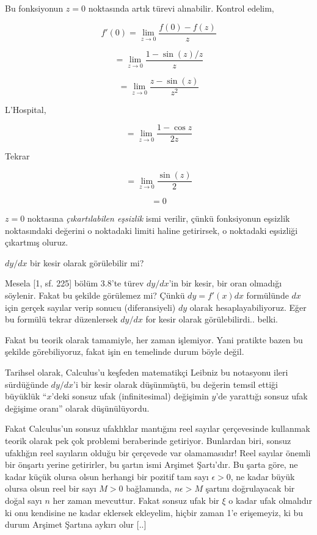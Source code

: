 \documentclass[12pt,fleqn]{article}\usepackage{../../common}
\begin{document}
Bu fonksiyonun $z=0$ noktasında artık türevi alınabilir. Kontrol edelim, 

$$ f'(0) = \lim_{z \to 0} \frac{f(0)-f(z)}{z}  $$

$$ = \lim_{z \to 0} \frac{1-\sin(z)/z}{z} $$

$$ = \lim_{z \to 0} \frac{z-\sin(z)}{z^2} $$

L'Hospital,

$$ = \lim_{z \to 0} \frac{1 - \cos z}{2z} $$

Tekrar

$$ = \lim_{z \to 0} \frac{ \sin(z)}{2} $$

$$ = 0 $$

$z=0$ noktasına {\em çıkartılabilen eşsizlik} ismi verilir, çünkü
fonksiyonun eşsizlik noktasındaki değerini o noktadaki limiti haline
getirirsek, o noktadaki eşsizliği çıkartmış oluruz. 

\newpage

$dy/dx$ bir kesir olarak görülebilir mi? 

Mesela [1, sf. 225] bölüm 3.8'te türev $dy/dx$'in bir kesir, bir oran
olmadığı söylenir. Fakat bu şekilde görülemez mi? Çünkü $dy = f'(x)dx$
formülünde $dx$ için gerçek sayılar verip sonucu (diferansiyeli) $dy$
olarak hesaplayabiliyoruz. Eğer bu formülü tekrar düzenlersek $dy/dx$ for
kesir olarak görülebilirdi.. belki.

Fakat bu teorik olarak tamamiyle, her zaman işlemiyor. Yani pratikte bazen
bu şekilde görebiliyoruz, fakat işin en temelinde durum böyle değil.

Tarihsel olarak, Calculus'u keşfeden matematikçi Leibniz bu notasyonu ileri
sürdüğünde $dy/dx$'i bir kesir olarak düşünmüştü, bu değerin temsil ettiği
büyüklük ``$x$'deki sonsuz ufak (infinitesimal) değişimin $y$'de yarattığı
sonsuz ufak değişime oranı'' olarak düşünülüyordu.

Fakat Calculus'un sonsuz ufaklıklar mantığını reel sayılar çerçevesinde
kullanmak teorik olarak pek çok problemi beraberinde getiriyor. Bunlardan
biri, sonsuz ufaklığın reel sayıların olduğu bir çerçevede var
olamamasıdır! Reel sayılar önemli bir önşartı yerine getirirler, bu şartın
ismi Arşimet Şartı'dır. Bu şarta göre, ne kadar küçük olursa olsun herhangi
bir pozitif tam sayı $\epsilon > 0$, ne kadar büyük olursa olsun reel bir
sayı $M>0$ bağlamında, $n\epsilon > M$ şartını doğrulayacak bir doğal sayı
$n$ her zaman mevcuttur. Fakat sonsuz ufak bir $\xi$ o kadar ufak olmalıdır
ki onu kendisine ne kadar eklersek ekleyelim, hiçbir zaman 1'e erişemeyiz,
ki bu durum Arşimet Şartına aykırı olur [..]
\end{document}
